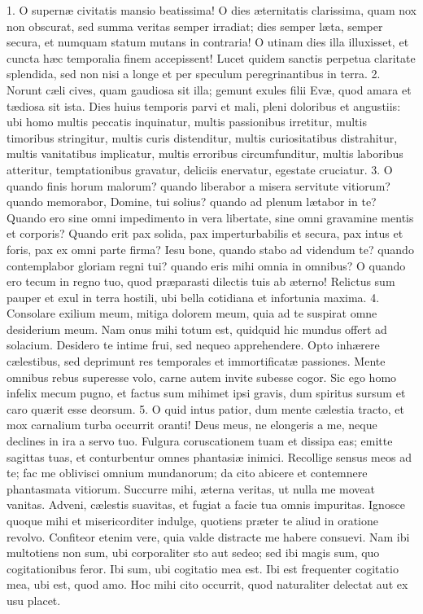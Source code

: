 \documentclass[twoside]{article}
\begin{document}
1. O supernæ civitatis mansio beatissima! O dies æternitatis clarissima, quam nox non obscurat, sed summa veritas semper irradiat; dies semper læta, semper secura, et numquam statum mutans in contraria! O utinam dies illa illuxisset, et cuncta hæc temporalia finem accepissent! Lucet quidem sanctis perpetua claritate splendida, sed non nisi a longe et per speculum peregrinantibus in terra.
2. Norunt cæli cives, quam gaudiosa sit illa; gemunt exules filii Evæ, quod amara et tædiosa sit ista. Dies huius temporis parvi et mali, pleni doloribus et angustiis: ubi homo multis peccatis inquinatur, multis passionibus irretitur, multis timoribus stringitur, multis curis distenditur, multis curiositatibus distrahitur, multis vanitatibus implicatur, multis erroribus circumfunditur, multis laboribus atteritur, temptationibus gravatur, deliciis enervatur, egestate cruciatur.
3. O quando finis horum malorum? quando liberabor a misera servitute vitiorum? quando memorabor, Domine, tui solius? quando ad plenum lætabor in te? Quando ero sine omni impedimento in vera libertate, sine omni gravamine mentis et corporis? Quando erit pax solida, pax imperturbabilis et secura, pax intus et foris, pax ex omni parte firma? Iesu bone, quando stabo ad videndum te? quando contemplabor gloriam regni tui? quando eris mihi omnia in omnibus? O quando ero tecum in regno tuo, quod præparasti dilectis tuis ab æterno! Relictus sum pauper et exul in terra hostili, ubi bella cotidiana et infortunia maxima.
4. Consolare exilium meum, mitiga dolorem meum, quia ad te suspirat omne desiderium meum. Nam onus mihi totum est, quidquid hic mundus offert ad solacium. Desidero te intime frui, sed nequeo apprehendere. Opto inhærere cælestibus, sed deprimunt res temporales et immortificatæ passiones. Mente omnibus rebus superesse volo, carne autem invite subesse cogor. Sic ego homo infelix mecum pugno, et factus sum mihimet ipsi gravis, dum spiritus sursum et caro quærit esse deorsum.
5. O quid intus patior, dum mente cælestia tracto, et mox carnalium turba occurrit oranti! Deus meus, ne elongeris a me, neque declines in ira a servo tuo. Fulgura coruscationem tuam et dissipa eas; emitte sagittas tuas, et conturbentur omnes phantasiæ inimici. Recollige sensus meos ad te; fac me oblivisci omnium mundanorum; da cito abicere et contemnere phantasmata vitiorum. Succurre mihi, æterna veritas, ut nulla me moveat vanitas. Adveni, cælestis suavitas, et fugiat a facie tua omnis impuritas. Ignosce quoque mihi et misericorditer indulge, quotiens præter te aliud in oratione revolvo. Confiteor etenim vere, quia valde distracte me habere consuevi. Nam ibi multotiens non sum, ubi corporaliter sto aut sedeo; sed ibi magis sum, quo cogitationibus feror. Ibi sum, ubi cogitatio mea est. Ibi est frequenter cogitatio mea, ubi est, quod amo. Hoc mihi cito occurrit, quod naturaliter delectat aut ex usu placet.
\end{document}
